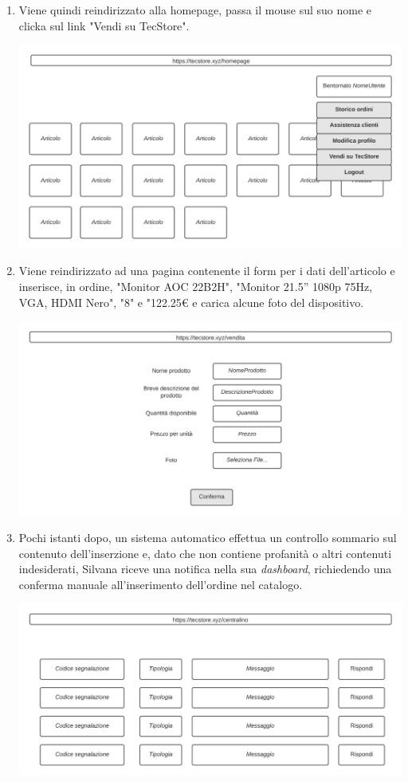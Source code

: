 \documentclass[12pt,a4paper]{article}
\begin{document}
\begin{enumerate}
\newpage

\item Viene quindi reindirizzato alla homepage, passa il mouse sul suo nome e clicka sul link "Vendi su TecStore".

\includegraphics[width=\textwidth]{Mockup/homepage_login}

\item Viene reindirizzato ad una pagina contenente il form per i dati dell'articolo e inserisce, in ordine, "Monitor AOC 22B2H", "Monitor 21.5'' 1080p 75Hz, VGA, HDMI Nero", "8" e "122.25€ e carica alcune foto del dispositivo.

\includegraphics[width=\textwidth]{Mockup/vendita}

\newpage
\item Pochi istanti dopo, un sistema automatico effettua un controllo sommario sul contenuto dell'inserzione e, dato che non contiene profanità o altri contenuti indesiderati, Silvana riceve una notifica nella sua \textit{dashboard}, richiedendo una conferma manuale all'inserimento dell'ordine nel catalogo.

\includegraphics[width=\textwidth]{Mockup/centralino}


\end{enumerate}
\end{document}
